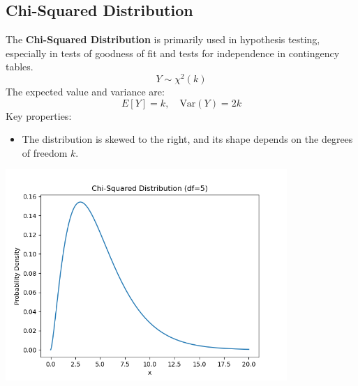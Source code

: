 \documentclass{article}
\begin{document}
\subsection{Chi-Squared Distribution}
The \textbf{Chi-Squared Distribution} is primarily used in hypothesis testing, especially in tests of goodness of fit and tests for independence in contingency tables.
\[
Y \sim \chi^2(k)
\]
The expected value and variance are:
\[
E[Y] = k, \quad \text{Var}(Y) = 2k
\]
Key properties:
\begin{itemize}
    \item The distribution is skewed to the right, and its shape depends on the degrees of freedom \(k\).
\end{itemize}
\begin{center}
    \includegraphics[width=0.8\textwidth]{./graphs/probDist/chi_squared_distribution.png}
\end{center}

\newpage
\end{document}

